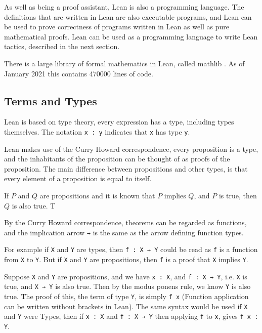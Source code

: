 \documentclass[11pt]{article} %
\theoremstyle{definition}
\theoremstyle{definition}
\theoremstyle{definition}
\theoremstyle{definition}
\theoremstyle{definition}
\theoremstyle{definition}
\begin{document}
As well as being a proof assistant, Lean is also a programming language. The definitions
that are written in Lean are also executable programs, and Lean can be used to prove correctness
of programs written in Lean as well as pure mathematical proofs. Lean can
be used as a programming language to write Lean tactics, described in the next section.

There is a large library of formal mathematics in Lean, called mathlib
\cite{ThemathlibCommunity2020}. As of January 2021 this contains 470000 lines of code.

\subsection{Terms and Types}

Lean is based on type theory, every expression has a type,
including types themselves.
The notation \lstinline{x : y} indicates that
\lstinline{x} has type \lstinline{y}.

Lean makes use of the Curry Howard correspondence, every proposition is a type,
and the inhabitants of the proposition can be thought of as proofs of the proposition.
The main difference between propositions and other types, is that every element
of a proposition is equal to itself.

If $P$ and $Q$ are propositions and it is known that $P$ implies $Q$, and
$P$ is true, then $Q$ is also true. T

By the Curry Howard correspondence, theorems can be regarded as functions, and the
implication arrow \lstinline{→} is the same as the arrow defining function types.

For example if \lstinline{X} and \lstinline{Y} are types, then
\lstinline{f : X → Y} could be read as \lstinline{f} is a function from
\lstinline{X} to \lstinline{Y}. But if \lstinline{X} and \lstinline{Y} are propositions,
then \lstinline{f} is a proof that \lstinline{X} implies \lstinline{Y}.

Suppose \lstinline{X} and \lstinline{Y} are propositions, and we have \lstinline{x : X},
and \lstinline{f : X → Y}, i.e. \lstinline{X} is true,
and \lstinline{X → Y} is also true. Then by the modus ponens rule, we know \lstinline{Y}
is also true. The proof of this, the term of type \lstinline{Y}, is simply \lstinline{f x}
(Function application can be written without brackets in Lean).
The same syntax would be used if \lstinline{X} and \lstinline{Y} were Types,
then if \lstinline{x : X} and \lstinline{f : X → Y} then applying \lstinline{f}
to \lstinline{x}, gives \lstinline{f x : Y}.
\end{document}
